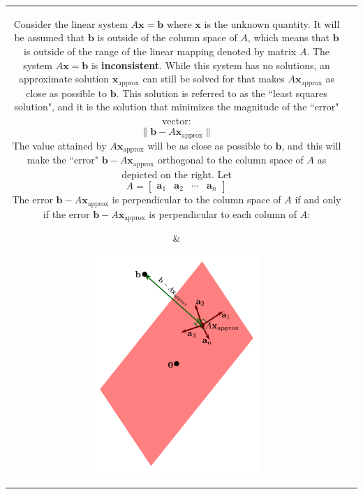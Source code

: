 \documentclass{article}
\begin{document}
\begin{tabular}{cc}
\parbox{0.5\textwidth}{
Consider the linear system \(A\mathbf{x} = \mathbf{b}\) where \(\mathbf{x}\) is the unknown quantity. It will be assumed that \(\mathbf{b}\) is outside of the column space of \(A\), which means that \(\mathbf{b}\) is outside of the range of the linear mapping denoted by matrix \(A\). The system \(A\mathbf{x} = \mathbf{b}\) is {\bf inconsistent}. While this system has no solutions, an approximate solution \(\mathbf{x}_{\text{approx}}\) can still be solved for that makes \(A\mathbf{x}_{\text{approx}}\) as close as possible to \(\mathbf{b}\). This solution is referred to as the ``least squares solution", and it is the solution that minimizes the magnitude of the ``error" vector:
\[\|\mathbf{b} - A\mathbf{x}_{\text{approx}}\|\]
 The value attained by \(A\mathbf{x}_{\text{approx}}\) will be as close as possible to \(\mathbf{b}\), and this will make the ``error" \(\mathbf{b} - A\mathbf{x}_{\text{approx}}\) orthogonal to the column space of \(A\) as depicted on the right. Let 
\[A = \begin{bmatrix}
\mathbf{a}_1 & \mathbf{a}_2 & \cdots & \mathbf{a}_n 
\end{bmatrix}\]
The error \(\mathbf{b} - A\mathbf{x}_{\text{approx}}\) is perpendicular to the column space of \(A\) if and only if the error \(\mathbf{b} - A\mathbf{x}_{\text{approx}}\) is perpendicular to each column of \(A\): 
} & \parbox{0.5\textwidth}{\includegraphics[width = 0.5\textwidth]{least_squares}}
\end{tabular}
\end{document}
